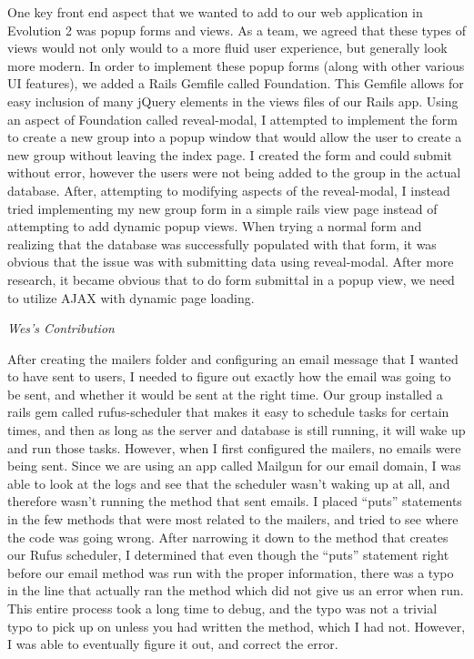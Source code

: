 \documentclass[11pt]{article}
\begin{document}
One key front end aspect that we wanted to add to our web application in Evolution 2 was popup forms and views.  As a team, we agreed that these types of views would not only would to a more fluid user experience, but generally look more modern.  In order to implement these popup forms (along with other various UI features), we added a Rails Gemfile called Foundation.  This Gemfile allows for easy inclusion of many jQuery elements in the views files of our Rails app.  Using an aspect of Foundation called reveal-modal, I attempted to implement the form to create a new group into a popup window that would allow the user to create a new group without leaving the index page.  I created the form and could submit without error, however the users were not being added to the group in the actual database.  After, attempting to modifying aspects of the reveal-modal, I instead tried implementing my new group form in a simple rails view page instead of attempting to add dynamic popup views.  When trying a normal form and realizing that the database was successfully populated with that form, it was obvious that the issue was with submitting data using reveal-modal.  After more research, it became obvious that to do form submittal in a popup view, we need to utilize AJAX with dynamic page loading.

\textit{Wes's Contribution}

After creating the mailers folder and configuring an email message that I wanted to have sent to users, I needed to figure out exactly how the email was going to be sent, and whether it would be sent at the right time.  Our group installed a rails gem called rufus-scheduler that makes it easy to schedule tasks for certain times, and then as long as the server and database is still running, it will wake up and run those tasks.  However, when I first configured the mailers, no emails were being sent.  Since we are using an app called Mailgun for our email domain, I was able to look at the logs and see that the scheduler wasn’t waking up at all, and therefore wasn’t running the method that sent emails.  I placed “puts” statements in the few methods that were most related to the mailers, and tried to see where the code was going wrong.  After narrowing it down to the method that creates our Rufus scheduler, I determined that even though the “puts” statement right before our email method was run with the proper information, there was a typo in the line that actually ran the method which did not give us an error when run.  This entire process took a long time to debug, and the typo was not a trivial typo to pick up on unless you had written the method, which I had not.  However, I was able to eventually figure it out, and correct the error.
\end{document}

